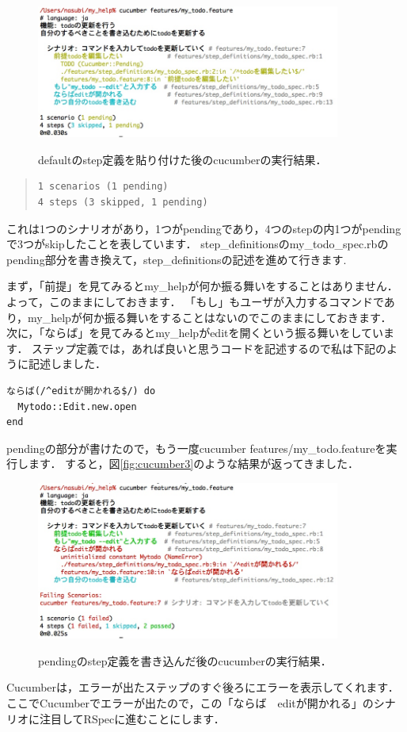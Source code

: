 \begin{figure}[htbp]\begin{center}
\includegraphics[width=10cm,bb= 0 0 737 553]{../figs/./cucumber2.jpg}
\caption{defaultのstep定義を貼り付けた後のcucumberの実行結果．}
\label{fig:cucumber2}
\label{default}\end{center}\end{figure}\begin{quote}\begin{verbatim}
1 scenarios (1 pending)
4 steps (3 skipped, 1 pending)
\end{verbatim}\end{quote}
これは1つのシナリオがあり，1つがpendingであり，4つのstepの内1つがpendingで3つがskipしたことを表しています．
step\_definitionsのmy\_todo\_spec.rbのpending部分を書き換えて，step\_definitionsの記述を進めて行きます.

まず，「前提」を見てみるとmy\_helpが何か振る舞いをすることはありません．
よって，このままにしておきます．
「もし」もユーザが入力するコマンドであり，my\_helpが何か振る舞いをすることはないのでこのままにしておきます．
次に，「ならば」を見てみるとmy\_helpがeditを開くという振る舞いをしています．
ステップ定義では，あれば良いと思うコードを記述するので私は下記のように記述しました．
\begin{lstlisting}[style=customCsh,basicstyle={\scriptsize\ttfamily}]
ならば(/^editが開かれる$/) do
  Mytodo::Edit.new.open
end
\end{lstlisting}
pendingの部分が書けたので，もう一度cucumber features/my\_todo.featureを実行します．
すると，図\ref{fig:cucumber3}のような結果が返ってきました．

\begin{figure}[htbp]\begin{center}
\includegraphics[width=10cm,bb= 0 0 737 553]{../figs/./cucumber3.jpg}
\caption{pendingのstep定義を書き込んだ後のcucumberの実行結果．}
\label{fig:cucumber3}
\label{default}\end{center}\end{figure}
Cucumberは，エラーが出たステップのすぐ後ろにエラーを表示してくれます．
ここでCucumberでエラーが出たので，この「ならば　editが開かれる」のシナリオに注目してRSpecに進むことにします．

